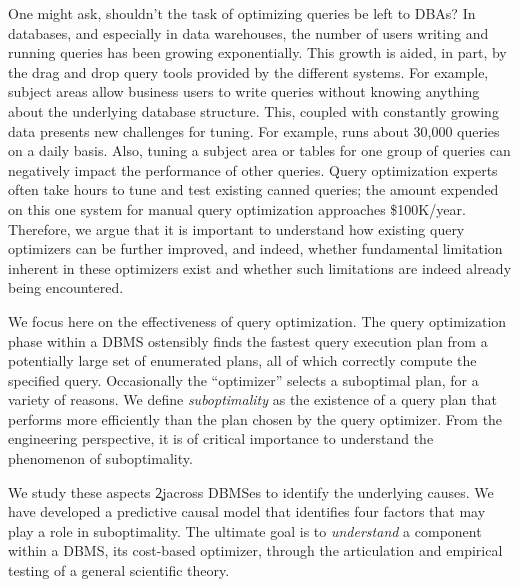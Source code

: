 \documentclass[prodmode,acmtods]{acmsmall}
\begin{document}
One might ask, shouldn't the task of optimizing queries be left to DBAs?  In
databases, and especially in data warehouses, the number of users writing
and running queries has been growing exponentially. This growth is aided, in
part, by the drag and drop query tools provided by the different
systems. For example, subject areas allow business users to write queries
without knowing anything about the underlying database structure. This,
coupled with constantly growing data presents new challenges for tuning. For
example,  runs about
30,000 queries on a daily basis. 
Also, tuning a subject area or tables for one group of queries can
negatively impact the performance of other queries. Query optimization experts often take hours to tune and test existing canned
queries; the amount expended on this one system for manual query optimization
approaches \$100K/year. Therefore, we argue that it is important to
understand how existing query optimizers can be further improved, and
indeed, whether  fundamental limitation inherent in these optimizers exist
and whether such limitations are indeed already being encountered.

We focus here on the effectiveness of query
optimization. The query optimization phase within a \hbox{DBMS} ostensibly finds the fastest
query execution plan from a potentially large set of enumerated plans, all of
which correctly compute the specified query. Occasionally the \hbox{``optimizer''}
selects a suboptimal plan, for a variety of reasons. We define {\em
  suboptimality} as the existence of a query plan that performs more
efficiently than the plan chosen by the query optimizer. From the engineering
perspective, it is of critical importance to understand the phenomenon of
suboptimality.

We study these aspects \c2j{}{across \hbox{DBMSes}} to identify the
underlying causes. We have developed a predictive causal model that
identifies four 
factors that may play a role in suboptimality. The ultimate goal is to {\em
  understand} a component within a \hbox{DBMS}, its cost-based optimizer, through the
articulation and empirical testing of a general scientific theory.
\end{document}
